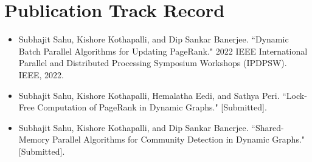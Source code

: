 \vspace{-2ex}
\section{Publication Track Record}
\vspace{-1ex}

\begin{itemize}[noitemsep, leftmargin=*]
  \item Subhajit Sahu, Kishore Kothapalli, and Dip Sankar Banerjee. ``Dynamic Batch Parallel Algorithms for Updating PageRank." 2022 IEEE International Parallel and Distributed Processing Symposium Workshops (IPDPSW). IEEE, 2022.
  \item Subhajit Sahu, Kishore Kothapalli, Hemalatha Eedi, and Sathya Peri. ``Lock-Free Computation of PageRank in Dynamic Graphs." [Submitted].
  \item Subhajit Sahu, Kishore Kothapalli, and Dip Sankar Banerjee. ``Shared-Memory Parallel Algorithms for Community Detection in Dynamic Graphs." [Submitted].
\end{itemize}
